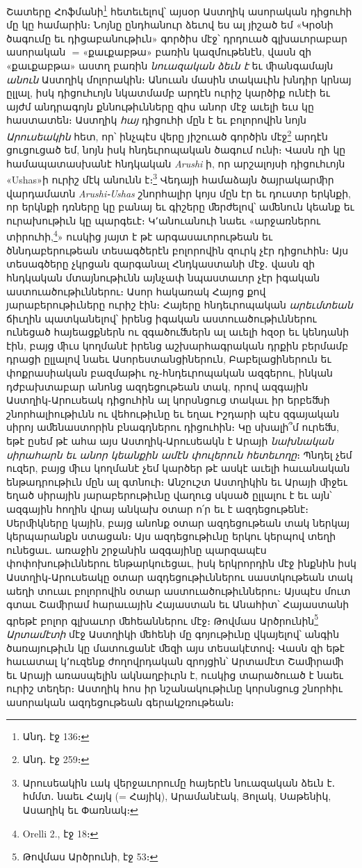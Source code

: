\documentclass{article}
\newcommand*\svgAAAB{}
\begin{document}
{Շատերը Հոֆմանի\footnote{Անդ․ էջ 136։} հետեւելով՝ այսօր Աստղիկ ասորական դիցուհի մը կը համարին։ Նոյնը ընդհանուր ձեւով ես ալ յիշած եմ «Կրօնի ծագումը եւ դիցաբանութիւն» գործիս մէջ՝ դրդուած գլխաւորաբար ասորական $\svgAAAB$ = «քաւքաբթա» բառին կազմութենէն, վասն զի «քաւքաբթա» աստղ բառին \emph{նուազական ձեւն է} եւ ﬕանգամայն \emph{անուն} Աստղիկ մոլորակին։ Անուան մասին տակաւին խնդիր կրնայ ըլլալ, իսկ դիցուհւոյն նկատմամբ արդէն ուրիշ կարծիք ունէի եւ այժմ անդրագոյն քննութիւնները զիս անոր մէջ աւելի եւս կը հաստատեն։ Աստղիկ \emph{հայ} դիցուհի մըն է եւ բոլորովին նոյն \emph{Արուսեակին} հետ, որ՝ ինչպէս վերը յիշուած գործին մէջ\footnote{Անդ․ էջ 259։} արդէն ցուցուցած եմ, նոյն իսկ հնդեւրոպական ծագում ունի։ Վասն ղի կը համապատասխանէ հնդկական \emph{Arushi} ի, որ արշալոյսի դիցուհւոյն «Ushas»ի ուրիշ մէկ անունն է։\footnote{Արուսեակին ւակ վերջաւորումը հայերէն նուազական ձեւն է․ հմմտ․ նաեւ Հայկ (= Հայիկ), Արամանէակ, Յոլակ, Սաթենիկ, Ասաղիկ եւ Փառնակ։} Վեդայի համաձայն ծայրակարﬕր վարդամատն \emph{Arushi֊Ushas} շնորհալիր կոյս մըն էր եւ դուստր երկնքի, որ երկնքի դռները կը բանայ եւ գիշերը ﬔրժելով՝ աﬔնուն կեանք եւ ուրախութիւն կը պարգեւէ։ Կ՚անուանուի նաեւ «արջառներու տիրուհի,\footnote{Orelli 2., էջ 18։}» ուսկից յայտ է թէ արգասաւորութեան եւ ծննդաբերութեան տեսագծերէն բոլորովին զուրկ չէր դիցուհին։ Այս տեսագծերը չկրցան զարգանալ Հնդկաստանի մէջ․ վասն զի հնդկական մտայնութիւնն այնչափ նպաստաւոր չէր իգական աստուածութիւններու։ Ասոր հակառակ Հայոց քով յարաբերութիւները ուրիշ էին։ Հայերը հնդեւրոպական \emph{արեւմտեան} ճիւղին պատկանելով՝ իրենց իգական աստուածութիւններու ունեցած հայեացքներն ու զգածուﬓերն ալ աւելի հզօր եւ կենդանի էին, բայց ﬕւս կողմանէ իրենց աշխարհագրական դրքին բերմամբ դրացի ըլլալով նաեւ Ասորեստանցիներուն, Բաբելացիներուն եւ փոքրասիական բազմաթիւ ոչ֊հնդեւրոպական ազգերու, ինկան դժբախտաբար անոնց ազդեցութեան տակ, որով ազգային Աստղիկ֊Արուսեակ դիցուհին ալ կորսնցուց տակաւ իր երբեﬓի շնորհալիութիւնն ու վեհութիւնը եւ եղաւ Իշդարի պէս զգայական սիրոյ աﬔնաստորին բնագդներու դիցուհին։ Կը սխալի՞մ ուրեﬓ, եթէ ըսեմ թէ ահա այս Աստղիկ֊Արուսեակն է Արայի \emph{նախնական սիրահարն եւ անոր կեանքին ամէն փուլերուն հետեւողը}։ Պնդել չեմ ուզեր, բայց ﬕւս կողմանէ չեմ կարծեր թէ ասկէ աւելի հաւանական ենթադրութիւն մըն ալ գտնուի։ Անշուշտ Աստղիկին եւ Արայի ﬕջեւ եղած սիրային յարաբերութիւնը վաղուց սկսած ըլլալու է եւ այն՝ ազգային հողին վրայ անկախ օտար ո՛ր եւ է ազդեցութենէ։ Սերﬕկները կային, բայց անոնք օտար ազդեցութեան տակ ներկայ կերպարանքն ստացան։ Այս ազդեցութիւնը երկու կերպով տեղի ունեցաւ․ առաջին շրջանին ազգայինը պարզապէս փոփոխութիւններու ենթարկուեցաւ, իսկ երկրորդին մէջ ինքնին իսկ Աստղիկ֊Արուսեակը օտար ազդեցութիւններու սաստկութեան տակ աեղի տուաւ բոլորովին օտար աստուածութիւններու։ Այսպէս մուտ գտաւ Շաﬕրամ հարաւային Հայաստան եւ Անահիտ՝ Հայաստանի գրեթէ բոլոր գլխաւոր ﬔհեաններու մէջ։ Թովմաս Արծրունին\footnote{Թովմաս Արծրունի, էջ 53։} \emph{Արտամէտի} մէջ Աստղիկի ﬔհենի մը գոյութիւնը վկայելով՝ անգին ծառայութիւն կը մատուցանէ ﬔզի այս տեսակէտով։ Վասն զի եթէ հաւատալ կ՚ուզենք ժողովրդական զրոյցին՝ Արտամէտ Շաﬕրաﬕ եւ Արայի առասպելին ակնաղբիւրն է, ուսկից տարածուած է նաեւ ուրիշ տեղեր։ Աստղիկ հոս իր նշանակութիւնը կորսնցուց շնորհիւ ասորական ազդեցութեան գերակշռութեան։

}
\end{document}

